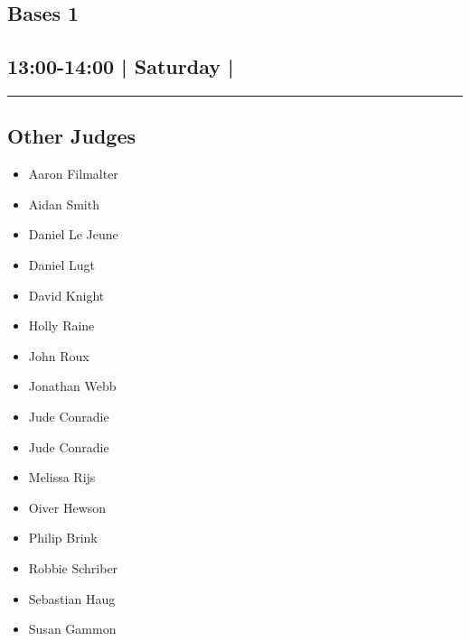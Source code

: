 \documentclass[10pt, A5]{article}
\begin{document}
		\begin{framed}
			\begin{minipage}{\textwidth}

			\setcounter{section}{27}
							\section{Bases 1}
						
			\subsection*{13:00-14:00 | Saturday | }

			\vspace{0.25cm}
			\hrule
			\vspace{0.25cm}


			\subsection*{Other Judges}
							

				\begin{multicols}{2}

			\begin{itemize}
											\item Aaron Filmalter
											\item Aidan Smith
											\item Daniel Le Jeune
											\item Daniel Lugt
											\item David Knight
											\item Holly Raine
											\item John Roux
											\item Jonathan Webb
											\item Jude Conradie
								\end{itemize}

			\vfill\null
			\columnbreak

			\begin{itemize}
											\item Jude Conradie
											\item Melissa Rijs
											\item Oiver Hewson
											\item Philip Brink
											\item Robbie Schriber
											\item Sebastian Haug
											\item Susan Gammon
								\end{itemize}


\end{multicols}
\end{minipage}
\end{framed}
\end{document}
